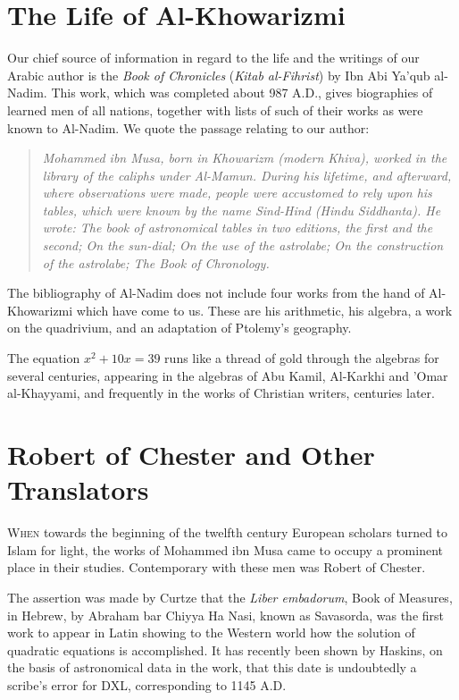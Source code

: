 \documentclass[11pt,a4paper,twoside]{book}
\begin{document}
\section{The Life of Al-Khowarizmi}

Our chief source of information in regard to the life and the writings of our Arabic author is the \textit{Book of Chronicles} (\textit{Kitab al-Fihrist}) by Ibn Abi Ya'qub al-Nadim. This work, which was completed about 987 A.D., gives biographies of learned men of all nations, together with lists of such of their works as were known to Al-Nadim. We quote the passage relating to our author:

\begin{quote}
\textit{Mohammed ibn Musa, born in Khowarizm (modern Khiva), worked in the library of the caliphs under Al-Mamun. During his lifetime, and afterward, where observations were made, people were accustomed to rely upon his tables, which were known by the name Sind-Hind (Hindu Siddhanta). He wrote: The book of astronomical tables in two editions, the first and the second; On the sun-dial; On the use of the astrolabe; On the construction of the astrolabe; The Book of Chronology.}
\end{quote}

The bibliography of Al-Nadim does not include four works from the hand of Al-Khowarizmi which have come to us. These are his arithmetic, his algebra, a work on the quadrivium, and an adaptation of Ptolemy's geography.

The equation $x^2 + 10x = 39$ runs like a thread of gold through the algebras for several centuries, appearing in the algebras of Abu Kamil, Al-Karkhi and 'Omar al-Khayyami, and frequently in the works of Christian writers, centuries later.

\section{Robert of Chester and Other Translators}

\lettrine[lines=3]{W}{hen} towards the beginning of the twelfth century European scholars turned to Islam for light, the works of Mohammed ibn Musa came to occupy a prominent place in their studies. Contemporary with these men was Robert of Chester.

The assertion was made by Curtze that the \textit{Liber embadorum}, Book of Measures, in Hebrew, by Abraham bar Chiyya Ha Nasi, known as Savasorda, was the first work to appear in Latin showing to the Western world how the solution of quadratic equations is accomplished. It has recently been shown by Haskins, on the basis of astronomical data in the work, that this date is undoubtedly a scribe's error for DXL, corresponding to 1145 A.D.
\end{document}
